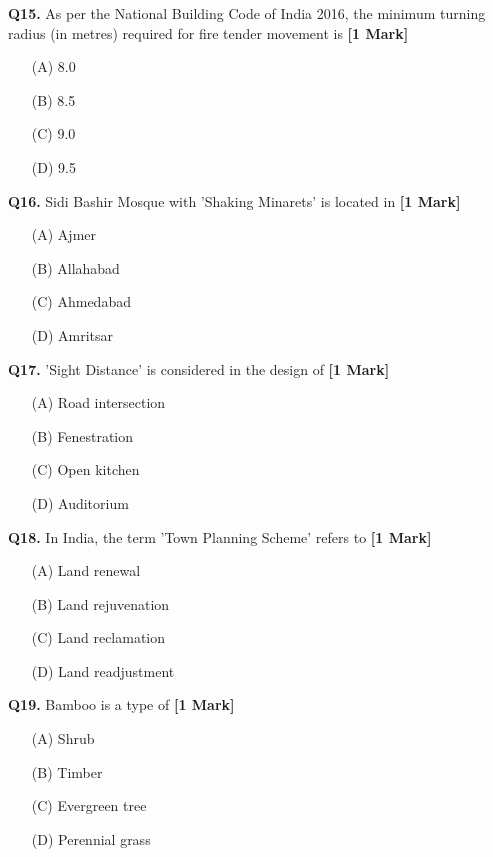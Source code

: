 \documentclass[11pt]{article}
\newcommand{\questiona}[2]{
    \noindent\textbf{Q#2.} #1 \hfill \textbf{[1 Mark]}
}
\begin{document}
\questiona{As per the National Building Code of India 2016, the minimum turning radius (in metres) required for fire tender movement is}{15}
\begin{enumerate}
    \item[(A)] 8.0  
    \item[(B)] 8.5  
    \item[(C)] 9.0  
    \item[(D)] 9.5  
\end{enumerate}
\vspace{0.5cm}

\questiona{Sidi Bashir Mosque with 'Shaking Minarets' is located in}{16}
\begin{enumerate}
    \item[(A)] Ajmer  
    \item[(B)] Allahabad  
    \item[(C)] Ahmedabad  
    \item[(D)] Amritsar  
\end{enumerate}
\vspace{0.5cm}

\questiona{'Sight Distance' is considered in the design of}{17}
\begin{enumerate}
    \item[(A)] Road intersection  
    \item[(B)] Fenestration  
    \item[(C)] Open kitchen  
    \item[(D)] Auditorium  
\end{enumerate}
\vspace{0.5cm}

\questiona{In India, the term 'Town Planning Scheme' refers to}{18}
\begin{enumerate}
    \item[(A)] Land renewal  
    \item[(B)] Land rejuvenation  
    \item[(C)] Land reclamation  
    \item[(D)] Land readjustment  
\end{enumerate}
\vspace{0.5cm}

\questiona{Bamboo is a type of}{19}
\begin{enumerate}
    \item[(A)] Shrub  
    \item[(B)] Timber  
    \item[(C)] Evergreen tree  
    \item[(D)] Perennial grass  
\end{enumerate}
\vspace{0.5cm}
\end{document}
